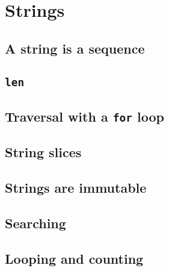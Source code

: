 \documentclass{article}
\begin{document}
\section{Strings}
\subsection{A string is a sequence}
\subsection{\texttt{len}}
\subsection{Traversal with a \texttt{for} loop}
\subsection{String slices}
\subsection{Strings are immutable}
\subsection{Searching}
\subsection{Looping and counting}
\end{document}

